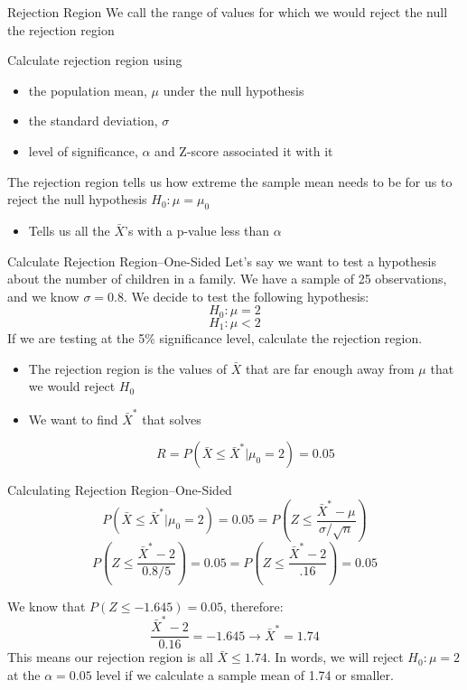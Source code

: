 \documentclass{beamer}
\begin{document}
\begin{frame}{Rejection Region}
	We call the range of values for which we would reject the null the \alert{rejection region}
	
	Calculate rejection region using
	\begin{itemize}
		\item the population mean, $\mu$ under the null hypothesis
		\item the standard deviation, $\sigma$
		\item level of significance, $\alpha$ and Z-score associated it with it
	\end{itemize}
	
	The rejection region tells us how extreme the sample mean needs to be for us to reject the null  hypothesis $H_0: \mu=\mu_0$
	\begin{itemize}
		\item Tells us all the $\bar{X}$'s with a p-value less than $\alpha$
	\end{itemize}
\end{frame}


\begin{frame}{Calculate Rejection Region--One-Sided}
	Let's say we want to test a hypothesis about the number of children in a family. We have a sample of 25 observations, and we know $\sigma=0.8$. We decide to test the following hypothesis:
	$$H_0:\mu=2$$
	$$H_1:\mu<2$$
	If we are testing at the 5\% significance level, calculate the rejection region. 
	\begin{itemize}
		\item The rejection region is the values of $\bar{X}$ that are far enough away from $\mu$ that we would reject $H_0$
		\item We want to find $\bar{X}^*$ that solves 
		
		$$R = P(\bar{X} \leq \bar{X}^* \vert \mu_0 =2) = 0.05$$
	\end{itemize}
\end{frame}

\frame{}
\frame{}

\begin{frame}{Calculating Rejection Region--One-Sided}
	$$P(\bar{X}\leq\bar{X}^* \vert \mu_0 = 2)=0.05=P(Z\leq\frac{\bar{X}^*-\mu}{\sigma/\sqrt{n}})$$
	$$P(Z\leq\frac{\bar{X}^*-2}{0.8/5})=0.05=P(Z\leq\frac{\bar{X}^*-2}{.16})=0.05$$
	
	We know that $P(Z \leq -1.645)=0.05$, therefore:
	$$\frac{\bar{X}^*-2}{0.16}=-1.645 \rightarrow \bar{X}^*=1.74$$
	This means our rejection region is all $\bar{X}\leq1.74$. In words, we will reject $H_0:\mu=2$ at the $\alpha=0.05$ level if we calculate a sample mean of 1.74 or smaller.
	
\end{frame}
\end{document}

